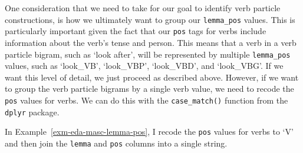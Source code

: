 \documentclass[
  letterpaper,
  DIV=11,
  numbers=noendperiod]{scrreport}
\theoremstyle{definition}
\theoremstyle{remark}
\begin{document}
One consideration that we need to take for our goal to identify verb
particle constructions, is how we ultimately want to group our
\texttt{lemma\_pos} values. This is particularly important given the
fact that our \texttt{pos} tags for verbs include information about the
verb's tense and person. This means that a verb in a verb particle
bigram, such as `look after', will be represented by multiple
\texttt{lemma\_pos} values, such as `look\_VB', `look\_VBP',
`look\_VBD', and `look\_VBG'. If we want this level of detail, we just
proceed as described above. However, if we want to group the verb
particle bigrams by a single verb value, we need to recode the
\texttt{pos} values for verbs. We can do this with the
\texttt{case\_match()} function from the \texttt{dplyr} package.

In Example~\ref{exm-eda-masc-lemma-pos}, I recode the \texttt{pos}
values for verbs to `V' and then join the \texttt{lemma} and
\texttt{pos} columns into a single string.
\end{document}
